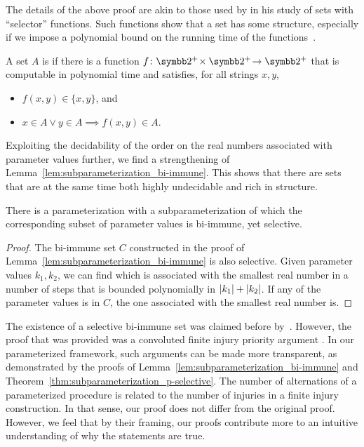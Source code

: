 The details of the above proof are akin to those used by \textcite{jockusch1968semirecursive} in his study of sets with \enquote{selector} functions.
Such functions show that a set has some structure, especially if we impose a polynomial bound on the running time of the functions~\parencite{selman1979p-selective}.
\begin{definition}
\label{def:p-selective}%
  A set $A$ is  if there is a function $f\colon \binary^+\! \times \binary^+\! \to \binary^+$ that is computable in polynomial time and satisfies, for all strings $x, y$,
  \begin{itemize}
  \item $f(x, y) \in \{x, y\}$, and
  \item $x \in A \lor y \in A \implies f(x, y) \in A$.
  \end{itemize}
\end{definition}

Exploiting the decidability of the order on the real numbers associated with parameter values further, we find a strengthening of Lemma~\ref{lem:subparameterization_bi-immune}.
This shows that there are sets that are at the same time both highly undecidable and rich in structure.
\begin{theorem}
\label{thm:subparameterization_p-selective}%
  There is a parameterization with a subparameterization of which the corresponding subset of parameter values is bi-immune, yet \pdash{}selective.
\end{theorem}
\begin{proof}
  The bi-immune set $C$ constructed in the proof of Lemma~\ref{lem:subparameterization_bi-immune} is also \pdash{}selective.
  Given parameter values $k_1, k_2$, we can find which is associated with the smallest real number in a number of steps that is bounded polynomially in ${\lvert k_1\rvert} + {\lvert k_2\rvert}$.
  If any of the parameter values is in $C$, the one associated with the smallest real number is.
\end{proof}

The existence of a \pdash{}selective bi-immune set was claimed before by~\textcite{goldsmith1993note}.
However, the proof that was provided was a convoluted finite injury priority argument \parencite[see also][Section~2.11]{downey2010algorithmic}.
In our parameterized framework, such arguments can be made more transparent, as demonstrated by the proofs of Lemma~\ref{lem:subparameterization_bi-immune} and Theorem~\ref{thm:subparameterization_p-selective}.
The number of alternations of a parameterized procedure is related to the number of injuries in a finite injury construction.
In that sense, our proof does not differ from the original proof.
However, we feel that by their framing, our proofs contribute more to an intuitive understanding of why the statements are true.
